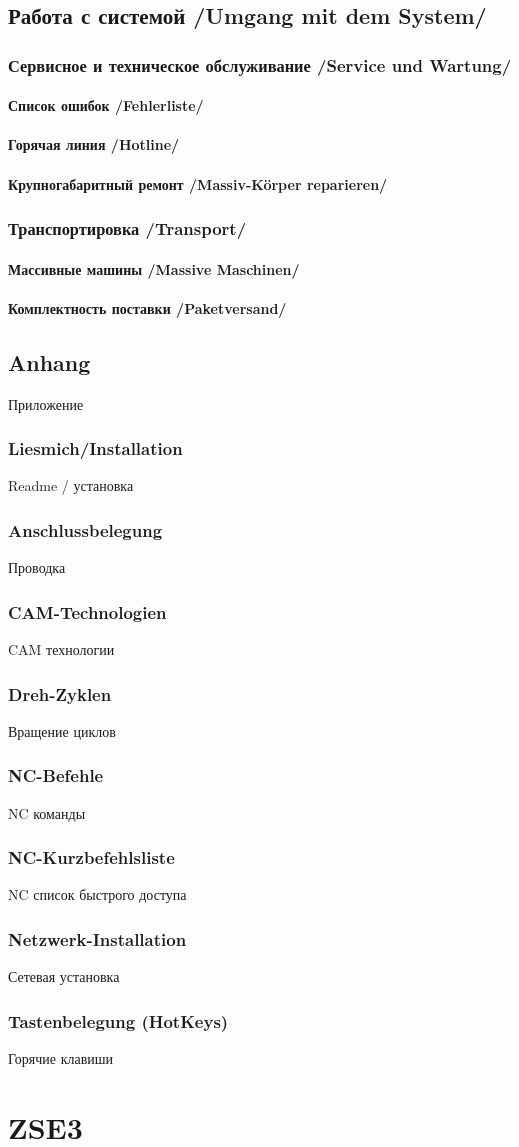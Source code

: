 \documentclass[14pt,a4paper]{book}
\newcommand{\TRchapter}[2]{\chapter{#2 /#1/}}
\newcommand{\TRsection}[2]{\section{#2 /#1/}}
\newcommand{\TRsubsection}[2]{\subsection{#2 /#1/}}
\begin{document}
\TRchapter{Umgang mit dem System}{Работа с системой}
	\TRsection{Service und Wartung}{Сервисное и техническое обслуживание}
		\TRsubsection{Fehlerliste}{Список ошибок}
		\TRsubsection{Hotline}{Горячая линия}
		\TRsubsection{Massiv-Körper reparieren}{Крупногабаритный ремонт}
	\TRsection{Transport}{Транспортировка}
		\TRsubsection{Massive Maschinen}{Массивные машины}
		\TRsubsection{Paketversand}{Комплектность поставки}

\chapter{Anhang}{Приложение}
	\section{Liesmich/Installation}{Readme / установка}
	\section{Anschlussbelegung}{Проводка}
	\section{CAM-Technologien}{CAM технологии}
	\section{Dreh-Zyklen}{Вращение циклов}
	\section{NC-Befehle}{NC команды}
	\section{NC-Kurzbefehlsliste}{NC список быстрого доступа}
	\section{Netzwerk-Installation}{Сетевая установка}
	\section{Tastenbelegung (HotKeys)}{Горячие клавиши}


\part{ZSE3}
\end{document}

